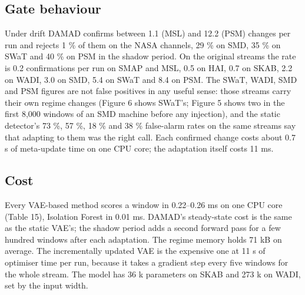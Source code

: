 \hypertarget{gate-behaviour}{%
\subsection{Gate behaviour}\label{gate-behaviour}}

Under drift DAMAD confirms between 1.1 (MSL) and 12.2 (PSM) changes per run and rejects 1 \% of them on the NASA channels, 29 \% on SMD, 35 \% on SWaT and 40 \% on PSM in the shadow period. On the original streams the rate is 0.2 confirmations per run on SMAP and MSL, 0.5 on HAI, 0.7 on SKAB, 2.2 on WADI, 3.0 on SMD, 5.4 on SWaT and 8.4 on PSM. The SWaT, WADI, SMD and PSM figures are not false positives in any useful sense: those streams carry their own regime changes (Figure 6 shows SWaT's; Figure 5 shows two in the first 8,000 windows of an SMD machine before any injection), and the static detector's 73 \%, 57 \%, 18 \% and 38 \% false-alarm rates on the same streams say that adapting to them was the right call. Each confirmed change costs about 0.7 s of meta-update time on one CPU core; the adaptation itself costs 11 ms.

\hypertarget{cost-1}{%
\subsection{Cost}\label{cost-1}}

Every VAE-based method scores a window in 0.22--0.26 ms on one CPU core (Table 15), Isolation Forest in 0.01 ms. DAMAD's steady-state cost is the same as the static VAE's; the shadow period adds a second forward pass for a few hundred windows after each adaptation. The regime memory holds 71 kB on average. The incrementally updated VAE is the expensive one at 11 s of optimiser time per run, because it takes a gradient step every five windows for the whole stream. The model has 36 k parameters on SKAB and 273 k on WADI, set by the input width.

